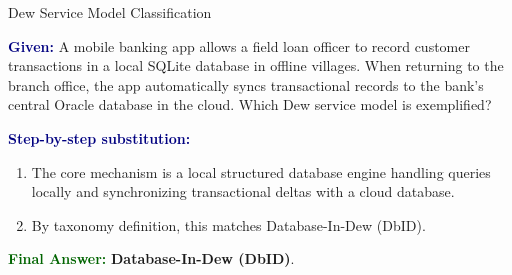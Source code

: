 \documentclass[11pt,a4paper,openany]{report}
\newcommand{\Given}{\par\textbf{\textcolor{navy}{Given:}} }
\newcommand{\Steps}{\par\textbf{\textcolor{navy}{Step-by-step substitution:}}\par}
\newcommand{\Answer}{\par\textbf{\textcolor{darkgreen}{Final Answer:}} }
\begin{document}
\begin{solved}{Dew Service Model Classification}
\Given A mobile banking app allows a field loan officer to record customer transactions in a local SQLite database in offline villages. When returning to the branch office, the app automatically syncs transactional records to the bank's central Oracle database in the cloud. Which Dew service model is exemplified?
\Steps
\begin{enumerate}[leftmargin=*]
  \item The core mechanism is a local structured database engine handling queries locally and synchronizing transactional deltas with a cloud database.
  \item By taxonomy definition, this matches Database-In-Dew (DbID).
\end{enumerate}
\Answer \textbf{Database-In-Dew (DbID)}.
\end{solved}
\end{document}
